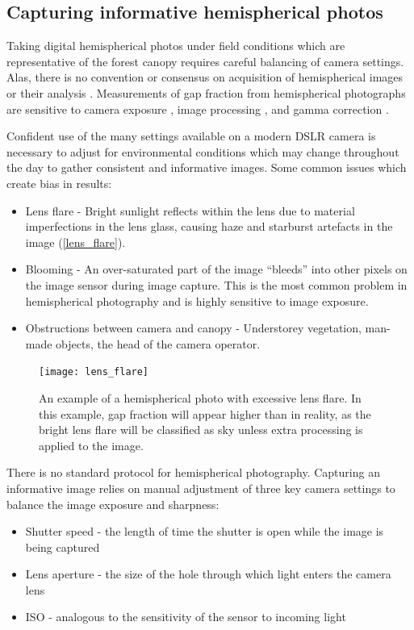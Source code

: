 \documentclass[11pt,a4paper]{article}
\begin{document}
\subsection{Capturing informative hemispherical photos} \label{inform}

Taking digital hemispherical photos under field conditions which are representative of the forest canopy requires careful balancing of camera settings. Alas, there is no convention or consensus on acquisition of hemispherical images or their analysis \citep{Beckschafer2013}. Measurements of gap fraction from hemispherical photographs are sensitive to camera exposure \citep{Macfarlane2000}, image processing \citep{Jonckheere2004}, and gamma correction \citep{Macfarlane2007a}. 

Confident use of the many settings available on a modern DSLR camera is necessary to adjust for environmental conditions which may change throughout the day to gather consistent and informative images. Some common issues which create bias in results:

\begin{itemize}
	\item{Lens flare - Bright sunlight reflects within the lens due to material imperfections in the lens glass, causing haze and starburst artefacts in the image (\autoref{lens_flare}).}
	\item{Blooming - An over-saturated part of the image ``bleeds'' into other pixels on the image sensor during image capture. This is the most common problem in hemispherical photography and is highly sensitive to image exposure.}
	\item{Obstructions between camera and canopy - Understorey vegetation, man-made objects, the head of the camera operator.}
\end{itemize}

\begin{figure}[H]
\centering
	\texttt{[image: lens\_flare]}
	\caption{An example of a hemispherical photo with excessive lens flare. In this example, gap fraction will appear higher than in reality, as the bright lens flare will be classified as sky unless extra processing is applied to the image.}
	\label{lens_flare}
\end{figure}

There is no standard protocol for hemispherical photography. Capturing an informative image relies on manual adjustment of three key camera settings to balance the image exposure and sharpness:

\begin{itemize}
	\item{Shutter speed - the length of time the shutter is open while the
		image is being captured}
	\item{Lens aperture - the size of the hole through which light enters 
		the camera lens}
	\item{ISO - analogous to the sensitivity of the sensor to incoming light}
\end{itemize}
\end{document}
